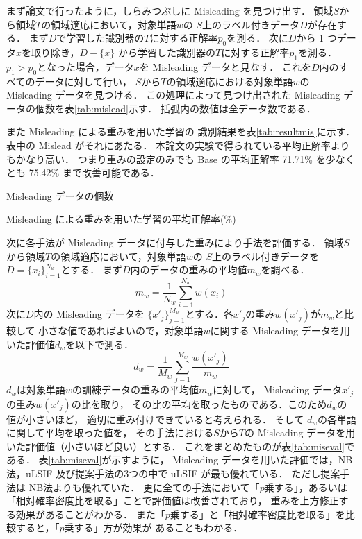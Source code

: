 \documentclass[japanese]{jnlp_1.4}
\begin{document}
まず論文\cite{yoshida}で行ったように，しらみつぶしに Misleading を見つけ出す．
領域$S$から領域$T$の領域適応において，対象単語$w$の
$S$上のラベル付きデータ$D$が存在する．
まず$D$で学習した識別器の$T$に対する正解率$p_0$を測る．
次に$D$から 1 つデータ$x$を取り除き，$D - \{x\}$
から学習した識別器の$T$に対する正解率$p_1$を測る．
$p_1 > p_0$となった場合，データ$x$を Misleading データと見なす．
これを$D$内のすべてのデータに対して行い，
$S$から$T$の領域適応における対象単語$w$の Misleading データを見つける．
この処理によって見つけ出された Misleading データの個数を\mbox{表\ref{tab:mislead}}示す．
括弧内の数値は全データ数である．

また Misleading による重みを用いた学習の
識別結果を\mbox{表\ref{tab:resultmis}}に示す．表中の Mislead がそれにあたる．
本論文の実験で得られている平均正解率よりもかなり高い．
つまり重みの設定のみでも Base の平均正解率 71.71\% を少なくとも 75.42\% まで改善可能である．

\begin{table}[t]
\caption{Misleading データの個数}
\label{tab:mislead}

\end{table}
\normalsize
\begin{table}[t]
\caption{Misleading による重みを用いた学習の平均正解率(\%)}
\label{tab:resultmis}

\end{table}

次に各手法が Misleading データに付与した重みにより手法を評価する．
領域$S$から領域$T$の領域適応において，対象単語$w$の
$S$上のラベル付きデータを$D = \{ x_i \}_{i=1}^{N_w}$とする．
まず$D$内のデータの重みの平均値$m_w$を調べる．
\[
m_w = \frac{1}{N_w} \sum_{i=1}^{N_w} w(x_i)
\]
次に$D$内の Misleading データを
$\{ x'_j \}_{j=1}^{M_w}$とする．各$x'_j$の重み$w(x'_j)$が$m_w$と比較して
小さな値であればよいので，対象単語$w$に関する Misleading データを用いた評価値$d_w$を以下で測る．
\[
d_w = \frac{1}{M_w} \sum_{j=1}^{M_w} \frac{w(x'_j)}{m_w}
\]
$d_w$は対象単語$w$の訓練データの重みの平均値$m_w$に対して，
Misleading データ$x'_j$の重み$w(x'_j)$の比を取り，
その比の平均を取ったものである．このため$d_w$の値が小さいほど，
適切に重み付けできていると考えられる．
そして
$d_w$の各単語に関して平均を取った値を，
その手法における$S$から$T$の Misleading  データを用いた評価値（小さいほど良い）とする．
これをまとめたものが\mbox{表\ref{tab:miseval}}である．
\mbox{表\ref{tab:miseval}}が示すように，
Misleading  データを用いた評価では，NB法，uLSIF 及び提案手法の3つの中で uLSIF が最も優れている．
ただし提案手法は NB法よりも優れていた．
更に全ての手法において「$p$乗する」，あるいは「相対確率密度比を取る」ことで評価値は改善されており，
重みを上方修正する効果があることがわかる．
また「$p$乗する」と「相対確率密度比を取る」を比較すると，「$p$乗する」方が効果が
あることもわかる．
\end{document}
